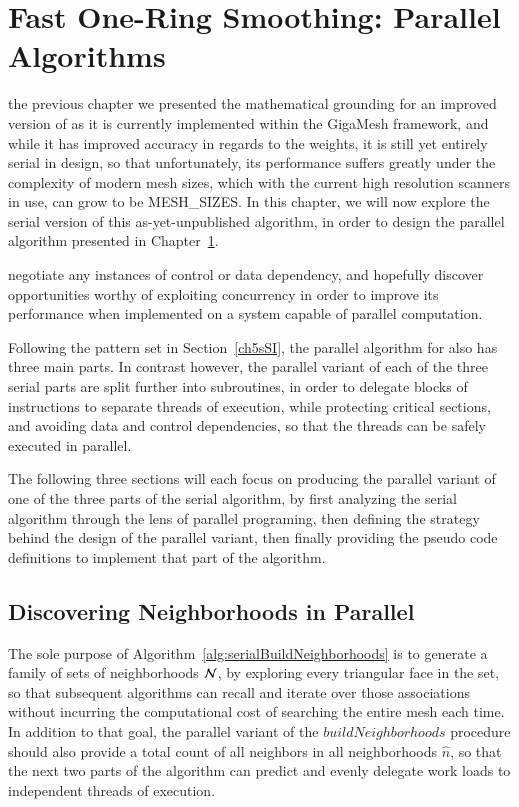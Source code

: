 \chapter{Fast One-Ring Smoothing: Parallel Algorithms}
\label{ch6}
 the previous chapter we presented the mathematical grounding for an improved version of  as it is currently implemented within the GigaMesh framework, and while it has improved accuracy in regards to the weights, it is still yet entirely serial in design, so that unfortunately, its performance suffers greatly under the complexity of modern mesh sizes, which with the current high resolution scanners in use, can grow to be MESH\_SIZES. In this chapter, we will now explore the serial version of this as-yet-unpublished algorithm, in order to design the parallel algorithm presented in Chapter~\ref{ch6}.

negotiate any instances of control or data dependency, and hopefully discover opportunities worthy of exploiting concurrency in order to improve its performance when implemented on a system capable of parallel computation.

Following the pattern set in Section~\ref{ch5sSI}, the parallel algorithm for  also has three main parts. In contrast however, the parallel variant of each of the three serial parts are split further into subroutines, in order to delegate blocks of instructions to separate threads of execution, while protecting critical sections, and avoiding data and control dependencies, so that the threads can be safely executed in parallel.

The following three sections will each focus on producing the parallel variant of one of the three parts of the serial algorithm, by first analyzing the serial algorithm through the lens of parallel programing, then defining the strategy behind the design of the parallel variant, then finally providing the pseudo code definitions to implement that part of the algorithm.

%
%
%
%
\section{Discovering Neighborhoods in Parallel}
\label{ch6sDN}
The sole purpose of Algorithm~\ref{alg:serialBuildNeighborhoods} is to generate a family of sets of neighborhoods $\mathcal{N}$, by exploring every triangular face in the set, so that subsequent algorithms can recall and iterate over those associations without incurring the computational cost of searching the entire mesh each time. In addition to that goal, the parallel variant of the $\mathit{buildNeighborhoods}$ procedure should also provide a total count of all neighbors in all neighborhoods $\hat{n}$, so that the next two parts of the  algorithm can predict and evenly delegate work loads to independent threads of execution.



